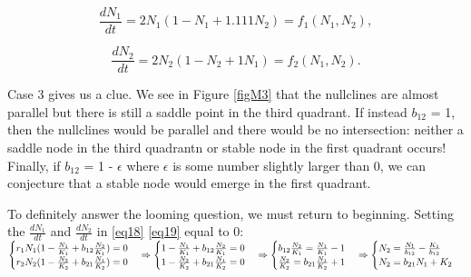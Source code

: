 \documentclass[11pt,a4paper]{scrartcl}
\theoremstyle{definition}
\begin{document}
\begin{equation} \label{eq26}
	\frac{dN_1}{dt}=2N_1(1-N_1+1.111N_2)=f_1(N_1, N_2),
\end{equation}

\begin{equation} \label{eq27}
	\frac{dN_2}{dt}=2N_2(1-N_2+1N_1)=f_2(N_1, N_2).
\end{equation}

Case 3 gives us a clue. We see in Figure \ref{figM3} that the nullclines are almost parallel but there is still a saddle point in the third quadrant. If instead $b_{12}$ = 1, then the nullclines would be parallel and there would be no intersection: neither a saddle node in the third quadrantn or stable node in the first quadrant occurs! Finally, if $b_{12}$ = 1 - $\epsilon$ where $\epsilon$ is some number slightly larger than 0, we can conjecture that a stable node would emerge in the first quadrant. \newline

To definitely answer the looming question, we must return to beginning.
Setting the $\frac{dN_1}{dt}$ and $\frac{dN_2}{dt}$ in \eqref{eq18} \eqref{eq19} equal to 0:
$\begin{cases} r_1N_1(1-\frac{N_1}{K_1}+b_{12}\frac{N_2}{K_1})=0 \\ r_2N_2(1-\frac{N_2}{K_2}+b_{21}\frac{N_1}{K_2})=0 \end{cases}\vspace{1em} \Rightarrow \begin{cases}1-\frac{N_1}{K_1}+b_{12}\frac{N_2}{K_1}=0 \\ 1-\frac{N_2}{K_2}+b_{21}\frac{N_1}{K_2}=0 \end{cases} \Rightarrow \begin{cases}b_{12}\frac{N_2}{K_1}=\frac{N_1}{K_1}-1 \\ \frac{N_2}{K_2}=b_{21}\frac{N_1}{K_2}+1 \end{cases} \Rightarrow \begin{cases} N_2=\frac{N_1}{b_{12}}-\frac{K_1}{b_{12}} \\ N_2=b_{21}N_1+K_2 \end{cases}$\newline\newline
\end{document}
